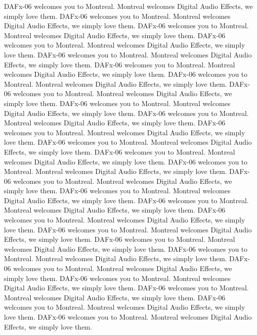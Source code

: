 \documentclass[twoside]{article}
\begin{document}
DAFx-06 welcomes you to Montreal. Montreal welcomes Digital Audio Effects, we simply love them. 
DAFx-06 welcomes you to Montreal. Montreal welcomes Digital Audio Effects, we simply love them. 
DAFx-06 welcomes you to Montreal. Montreal welcomes Digital Audio Effects, we simply love them. 
DAFx-06 welcomes you to Montreal. Montreal welcomes Digital Audio Effects, we simply love them. 
DAFx-06 welcomes you to Montreal. Montreal welcomes Digital Audio Effects, we simply love them. 
DAFx-06 welcomes you to Montreal. Montreal welcomes Digital Audio Effects, we simply love them. 
DAFx-06 welcomes you to Montreal. Montreal welcomes Digital Audio Effects, we simply love them. 
DAFx-06 welcomes you to Montreal. Montreal welcomes Digital Audio Effects, we simply love them. 
DAFx-06 welcomes you to Montreal. Montreal welcomes Digital Audio Effects, we simply love them. 
DAFx-06 welcomes you to Montreal. Montreal welcomes Digital Audio Effects, we simply love them. 
DAFx-06 welcomes you to Montreal. Montreal welcomes Digital Audio Effects, we simply love them. 
DAFx-06 welcomes you to Montreal. Montreal welcomes Digital Audio Effects, we simply love them. 
DAFx-06 welcomes you to Montreal. Montreal welcomes Digital Audio Effects, we simply love them. 
DAFx-06 welcomes you to Montreal. Montreal welcomes Digital Audio Effects, we simply love them. 
DAFx-06 welcomes you to Montreal. Montreal welcomes Digital Audio Effects, we simply love them. 
DAFx-06 welcomes you to Montreal. Montreal welcomes Digital Audio Effects, we simply love them. 
DAFx-06 welcomes you to Montreal. Montreal welcomes Digital Audio Effects, we simply love them. 
DAFx-06 welcomes you to Montreal. Montreal welcomes Digital Audio Effects, we simply love them. 
DAFx-06 welcomes you to Montreal. Montreal welcomes Digital Audio Effects, we simply love them. 
DAFx-06 welcomes you to Montreal. Montreal welcomes Digital Audio Effects, we simply love them. 
DAFx-06 welcomes you to Montreal. Montreal welcomes Digital Audio Effects, we simply love them. 
DAFx-06 welcomes you to Montreal. Montreal welcomes Digital Audio Effects, we simply love them. 
DAFx-06 welcomes you to Montreal. Montreal welcomes Digital Audio Effects, we simply love them. 
DAFx-06 welcomes you to Montreal. Montreal welcomes Digital Audio Effects, we simply love them. 
DAFx-06 welcomes you to Montreal. Montreal welcomes Digital Audio Effects, we simply love them. 
DAFx-06 welcomes you to Montreal. Montreal welcomes Digital Audio Effects, we simply love them. 



\end{document}

